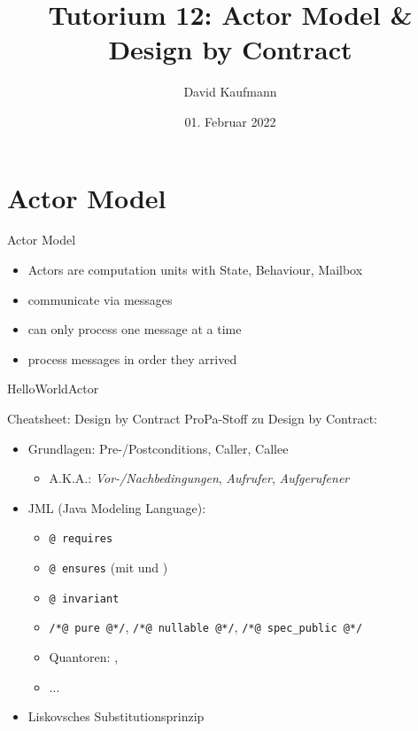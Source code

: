 \documentclass{beamer}
\title{Tutorium 12: Actor Model \& Design by Contract}
\author{David Kaufmann}
\institute{Tutorium Programmierparadigmen am KIT}
\date{01. Februar 2022}
\begin{document}
\begin{frame}
    \titlepage
\end{frame}

\section{Actor Model}
\begin{frame}{Actor Model}
    \begin{itemize}
        \item Actors are computation units with State, Behaviour, Mailbox
        \item communicate via messages
        \item can only process one message at a time
        \item process messages in order they arrived
    \end{itemize}
\end{frame}

\begin{frame}{HelloWorldActor}
    
\end{frame}

\begin{frame}{Cheatsheet: Design by Contract}
	ProPa-Stoff zu Design by Contract:

	\begin{itemize}
		\item Grundlagen: Pre-/Postconditions, Caller, Callee
		\begin{itemize}
                  \item A.K.A.: \emph{Vor-/Nachbedingungen}, \emph{Aufrufer}, \emph{Aufgerufener}
		\end{itemize}
		\item JML (Java Modeling Language):
		\begin{itemize}
			\item \texttt{@ requires}
			\item \texttt{@ ensures} (mit \texttt{\string\old} und \texttt{\string\result})
			\item \texttt{@ invariant}
			\item \texttt{/*@ pure @*/}, \texttt{/*@ nullable @*/}, \texttt{/*@ spec\_public @*/}
			\item Quantoren: \texttt{\string\forall}, \texttt{\string\exists}
			\item ...
		\end{itemize}
		\item Liskovsches Substitutionsprinzip
	\end{itemize}
\end{frame}
\end{document}
